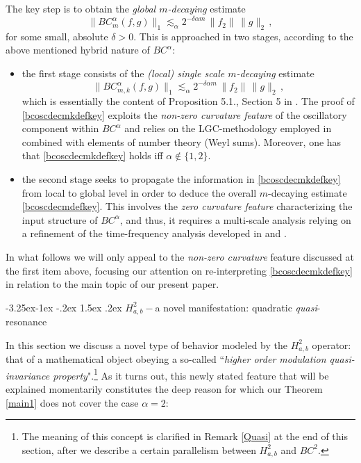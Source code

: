 \documentclass[a4paper,reqno]{amsart}
\makeatletter
\def\subsection{\@startsection{subsection}{2}{\z@}%
	{-3.25ex\@plus -1ex \@minus -.2ex}%
	{1.5ex \@plus .2ex}%
	{\normalfont\bfseries\boldmath}}
\numberwithin{equation}{section}
\theoremstyle{definition}
\def\beq{\begin{equation}}
\def\eeq{\end{equation}}
\def\beq{\begin{equation}}
\def\eeq{\end{equation}}
\def\a{\alpha}
\def\beq{\begin{equation}}
\def\eeq{\end{equation}}
\def\beq{\begin{equation}}
\def\eeq{\end{equation}}
\def\d{\delta}
\makeatother
\begin{document}
The key step is to obtain the \emph{global $m$-decaying} estimate
\beq\label{bcoscdecmdefkey}
\|BC^{\a}_{m}(f,g)\|_1\lesssim_{\a} 2^{-\d \a m}\,\|f_2\|\,\|g\|_2\,,
\eeq
for some small, absolute $\d>0$. This is approached in two stages, according to the above mentioned hybrid nature of $BC^{\a}$:

\begin{itemize}
\item the first stage consists of the \emph{(local) single scale $m$-decaying} estimate
\beq\label{bcoscdecmkdefkey}
\|BC^{\a}_{m,k}(f,g)\|_1\lesssim_{\a} 2^{-\d \a m}\,\|f_2\|\,\|g\|_2\,,
\eeq
which is essentially the content of Proposition 5.1., Section 5 in \cite{BBLV21}. The proof of \eqref{bcoscdecmkdefkey} exploits the \emph{non-zero curvature feature} of the oscillatory component within $BC^{\a}$ and relies on the LGC-methodology employed in \cite{Lie19} combined with elements of number theory (Weyl sums). Moreover, one has that \eqref{bcoscdecmkdefkey} holds iff $\a\notin\{1,2\}$.

\item the second stage seeks to propagate the information in \eqref{bcoscdecmkdefkey} from local to global level in order to deduce the overall $m$-decaying estimate \eqref{bcoscdecmdefkey}. This involves the \emph{zero curvature feature} characterizing the input structure of $BC^{\a}$, and thus, it requires a multi-scale analysis relying on a refinement of the time-frequency analysis developed in \cite{LT97} and \cite{LT99}.
\end{itemize}

In what follows we will only appeal to the \emph{non-zero curvature} feature discussed at the first item above, focusing our attention on re-interpreting \eqref{bcoscdecmkdefkey} in relation to the main topic of our present paper.

\subsection{$H_{a,b}^{2}-$a novel manifestation: quadratic \emph{quasi}-resonance}\label{H2discussion}


\indent In this section we discuss a novel type of behavior modeled by the $H_{a,b}^{2}$ operator: that of a mathematical object obeying a so-called ``\emph{higher order modulation quasi-invariance property}".\footnote{The meaning of this concept is clarified in Remark \ref{Quasi} at the end of this section, after we describe a certain parallelism between $H_{a,b}^{2}$ and $BC^2$.} As it turns out, this newly stated feature that will be explained momentarily constitutes the deep reason for which our Theorem \ref{main1} does not cover the case $\a=2$:
\medskip
\end{document}
